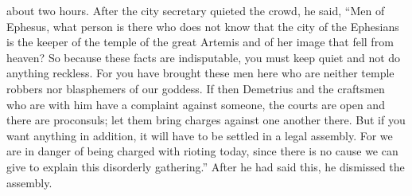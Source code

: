 {about
two
hours.
After the city secretary
quieted
the crowd,
he said,
“Men
of Ephesus,
what
person
is there
who
does
not
know
that the city
of the Ephesians
is
the keeper of the temple
of the great
Artemis
and
of her image that fell from heaven?
So
because these
facts
are
indisputable, you
must
keep quiet
and
not
do
anything
reckless.
For
you have brought
these
men
here who are neither
temple robbers
nor
blasphemers
of our
goddess.
If
then
Demetrius
and
the craftsmen
who are with
him
have
a complaint
against
someone,
the courts
are open and
there are
proconsuls;
let them bring
charges
against one another there.
But
if
you want
anything in addition,
it will have to be settled
in a legal
assembly.
For
we are in danger
of being charged
with
rioting
today,
since there is
no
cause
we can
give
to explain
this
disorderly gathering.”
After
he had said
this,
he dismissed
the assembly.

}
